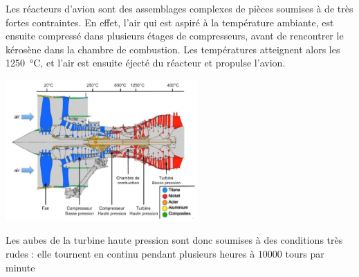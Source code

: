 
Les réacteurs d'avion sont des assemblages complexes de pièces soumises à de
très fortes contraintes. En effet, l'air qui est aspiré à la température 
ambiante, est ensuite compressé dans plusieurs étages de compresseurs, 
avant de rencontrer le kérosène dans la chambre de combustion. Les températures
atteignent alors les \SI{1250}{\celsius}, et l'air est ensuite éjecté du réacteur
et propulse l'avion.


\centerline{\includegraphics[width=0.55\textwidth]{images/coupe_CFM56.png}}


Les aubes de la turbine haute pression sont donc soumises à des conditions
très rudes : elle tournent en continu pendant plusieurs heures à $10000$ tours par minute


